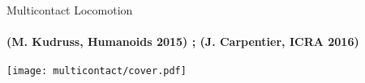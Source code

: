 
\begin{frame}{Multicontact Locomotion}
\framesubtitle{
  \textcolor{green!30!black!80}{
    (M. Kudruss, Humanoids 2015)  ;
    (J. Carpentier, ICRA 2016)
  }
}

\begin{center}
  \texttt{[image: multicontact/cover.pdf]}
  \scalebox{0.3}{}
\end{center}
\vspace*{-0.5cm}
\begin{center}
  \scalebox{0.7}{}
\end{center}

\end{frame}



